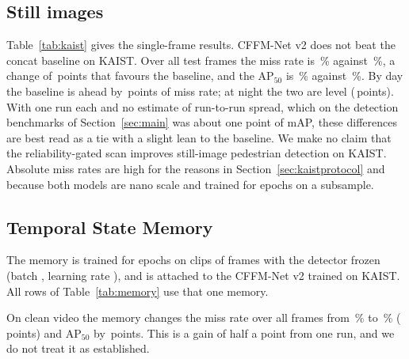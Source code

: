 \subsection{Still images}
\label{sec:kaiststills}

Table~\ref{tab:kaist} gives the single-frame results. CFFM-Net v2 does not beat the concat baseline on KAIST. Over all test frames the miss rate is \kstCffmAllMr{}\,\% against \kstConcatAllMr{}\,\%, a change of \kstMarginAllMr{}\,points that favours the baseline, and the AP$_{50}$ is \kstCffmAllApFifty{}\,\% against \kstConcatAllApFifty{}\,\%. By day the baseline is ahead by \kstMarginDayMr{}\,points of miss rate; at night the two are level (\kstMarginNightMr{}\,points). With one run each and no estimate of run-to-run spread, which on the detection benchmarks of Section~\ref{sec:main} was about one point of mAP, these differences are best read as a tie with a slight lean to the baseline. We make no claim that the reliability-gated scan improves still-image pedestrian detection on KAIST. Absolute miss rates are high for the reasons in Section~\ref{sec:kaistprotocol} and because both models are nano scale and trained for \cfgKaistEpochs{} epochs on a subsample.

\subsection{Temporal State Memory}
\label{sec:kaistmemory}
The memory is trained for \cfgMemEpochs{} epochs on clips of \cfgClipLen{} frames with the detector frozen (batch \cfgMemBatch{}, learning rate \cfgMemLr{}), and is attached to the CFFM-Net v2 trained on KAIST. All rows of Table~\ref{tab:memory} use that one memory.



On clean video the memory changes the miss rate over all frames from \memCleanImageAllMr{}\,\% to \memCleanMemoryAllMr{}\,\% (\memChangeCleanAllMr{}\,points) and AP$_{50}$ by \memChangeCleanAllApFifty{}\,points. This is a gain of half a point from one run, and we do not treat it as established.

